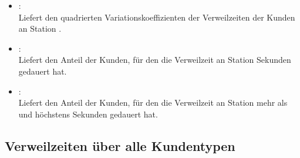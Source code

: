 \begin{itemize}
\item
{}:\\
Liefert den quadrierten Variationskoeffizienten der Verweilzeiten der Kunden an Station .

\item
{}:\\
Liefert den Anteil der Kunden, für den die Verweilzeit an Station   Sekunden gedauert hat.

\item
{}:\\
Liefert den Anteil der Kunden, für den die Verweilzeit an Station  mehr als  und höchstens  Sekunden gedauert hat.

\end{itemize}



\subsection{Verweilzeiten über alle Kundentypen}
  
